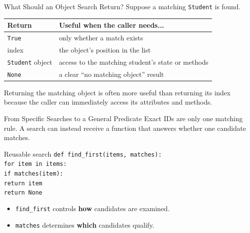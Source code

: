 \documentclass[aspectratio=169,10pt]{beamer}
\begin{document}
\begin{frame}{What Should an Object Search Return?}
  Suppose a matching \texttt{Student} is found.

  \begin{center}
    \renewcommand{\arraystretch}{1.30}
    \begin{tabular}{l|l}
      \textbf{Return} & \textbf{Useful when the caller needs...} \\\hline
      \texttt{True} & only whether a match exists \\
      index & the object's position in the list \\
      \texttt{Student} object & access to the matching student's state or methods \\
      \texttt{None} & a clear ``no matching object'' result
    \end{tabular}
  \end{center}

  \begin{keyidea}
    Returning the matching object is often more useful than returning its index because the caller can immediately access its attributes and methods.
  \end{keyidea}
\end{frame}

\begin{frame}{From Specific Searches to a General Predicate}
  Exact IDs are only one matching rule. A search can instead receive a function that answers whether one candidate matches.

  \begin{block}{Reusable search}
    \texttt{def find\_first(items, matches):}\\
    \hspace*{0.20in}\texttt{for item in items:}\\
    \hspace*{0.40in}\texttt{if matches(item):}\\
    \hspace*{0.60in}\texttt{return item}\\
    \hspace*{0.20in}\texttt{return None}
  \end{block}

  \begin{itemize}
    \item \texttt{find\_first} controls \textbf{how} candidates are examined.
    \item \texttt{matches} determines \textbf{which} candidates qualify.
  \end{itemize}
\end{frame}
\end{document}
